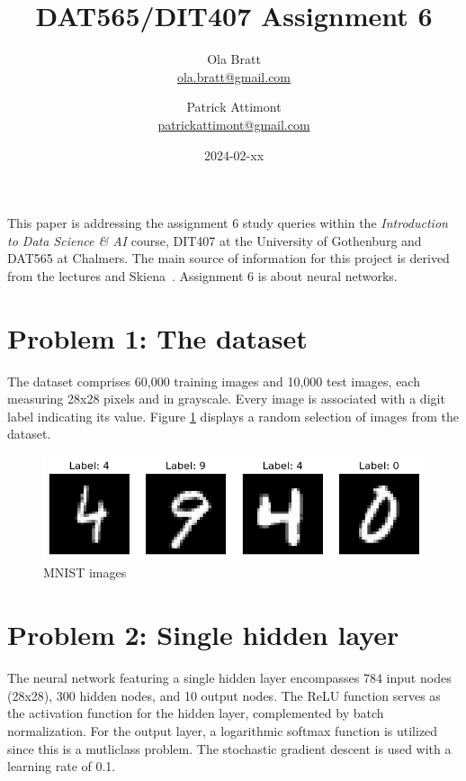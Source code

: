 \documentclass[a4paper]{article}
\begin{document}
\author{Ola Bratt \\
  \href{mailto:ola.bratt@gmail.com}{ola.bratt@gmail.com}
  \and
  Patrick Attimont \\
  \href{patrickattimont@gmail.com}{patrickattimont@gmail.com}
}

\title{DAT565/DIT407 Assignment 6}
\date{2024-02-xx}

\maketitle

This paper is addressing the assignment 6 study queries within the \emph{Introduction to Data Science \& AI} course, DIT407 at 
the University of Gothenburg and DAT565 at Chalmers. The main source of information for this project
is derived from the lectures and Skiena~\cite{Skiena:2024}. Assignment 6 is about neural networks.

\section*{Problem 1: The dataset}

The dataset comprises 60,000 training images and 10,000 test images, each measuring 28x28 pixels and in grayscale. 
Every image is associated with a digit label indicating its value. 
Figure \ref{fig:mnist_images} displays a random selection of images from the dataset.



\begin{figure}[H]
  \begin{center}
    \includegraphics[width=\textwidth]{ola/mnist_images.png}
    \caption{MNIST images}
    \label{fig:mnist_images}
  \end{center}
\end{figure}

\section*{Problem 2: Single hidden layer}

The neural network featuring a single hidden layer encompasses 784 input nodes (28x28), 300 hidden nodes, and 10 output nodes. 
The ReLU function serves as the activation function for the hidden layer, complemented by batch normalization. 
For the output layer, a logarithmic softmax function is utilized since this is a mutliclass problem.
The stochastic gradient descent is used with a learning rate of 0.1.
\end{document}

